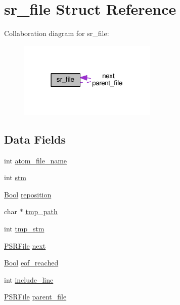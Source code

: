 \hypertarget{structsr__file}{}\section{sr\+\_\+file Struct Reference}
\label{structsr__file}


Collaboration diagram for sr\+\_\+file\+:\nopagebreak
\begin{figure}[H]
\begin{center}
\leavevmode
\includegraphics[width=187pt]{structsr__file__coll__graph}
\end{center}
\end{figure}
\subsection*{Data Fields}
\begin{DoxyCompactItemize}
\item 
int \hyperlink{structsr__file_ae27edb1456ddb3b0453eca14e614c66b}{atom\+\_\+file\+\_\+name}
\item 
int \hyperlink{structsr__file_a586a54828b5daba157cc712806a6f2b3}{stm}
\item 
\hyperlink{bool_8h_afdcfe6db5bea87bd493a3fe2c513d5ef}{Bool} \hyperlink{structsr__file_a090b36b9b75dfbccd963f6787fd3f18e}{reposition}
\item 
char $\ast$ \hyperlink{structsr__file_adc9ad8d65ba5f5b3bfc7a6c6ca329d88}{tmp\+\_\+path}
\item 
int \hyperlink{structsr__file_a200078e5cefb8ff2bd556997ff08b429}{tmp\+\_\+stm}
\item 
\hyperlink{src__rdr__c_8c_a4582196a8ccd74caa6a3df193b07656e}{P\+S\+R\+File} \hyperlink{structsr__file_aa8623a318506eaad8a03faca16a7e72e}{next}
\item 
\hyperlink{bool_8h_afdcfe6db5bea87bd493a3fe2c513d5ef}{Bool} \hyperlink{structsr__file_ae76a89a158199f98536900d0fccdd0c4}{eof\+\_\+reached}
\item 
int \hyperlink{structsr__file_ae50c7011dac81b055f3cfbf64ae03598}{include\+\_\+line}
\item 
\hyperlink{src__rdr__c_8c_a4582196a8ccd74caa6a3df193b07656e}{P\+S\+R\+File} \hyperlink{structsr__file_a57283a9f804b73dcd5bca6982ba8ac95}{parent\+\_\+file}
\end{DoxyCompactItemize}


